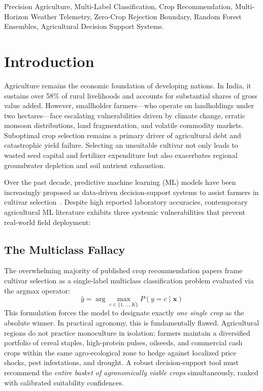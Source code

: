 \documentclass[conference]{IEEEtran}
\begin{document}
\begin{IEEEkeywords}
Precision Agriculture, Multi-Label Classification, Crop Recommendation, Multi-Horizon Weather Telemetry, Zero-Crop Rejection Boundary, Random Forest Ensembles, Agricultural Decision Support Systems.
\end{IEEEkeywords}

\section{Introduction}
Agriculture remains the economic foundation of developing nations. In India, it sustains over 58\% of rural livelihoods and accounts for substantial shares of gross value added. However, smallholder farmers—who operate on landholdings under two hectares—face escalating vulnerabilities driven by climate change, erratic monsoon distributions, land fragmentation, and volatile commodity markets. Suboptimal crop selection remains a primary driver of agricultural debt and catastrophic yield failure. Selecting an unsuitable cultivar not only leads to wasted seed capital and fertilizer expenditure but also exacerbates regional groundwater depletion and soil nutrient exhaustion.

Over the past decade, predictive machine learning (ML) models have been increasingly proposed as data-driven decision-support systems to assist farmers in cultivar selection~\cite{patel2020crop,kumar2021machine}. Despite high reported laboratory accuracies, contemporary agricultural ML literature exhibits three systemic vulnerabilities that prevent real-world field deployment:

\subsection{The Multiclass Fallacy}
The overwhelming majority of published crop recommendation papers frame cultivar selection as a single-label multiclass classification problem evaluated via the argmax operator:
\begin{equation}
\hat{y} = \arg\max_{c \in \{1,\dots,K\}} P(y = c \mid \mathbf{x})
\end{equation}
This formulation forces the model to designate exactly \textit{one single crop} as the absolute winner. In practical agronomy, this is fundamentally flawed. Agricultural regions do not practice monoculture in isolation; farmers maintain a diversified portfolio of cereal staples, high-protein pulses, oilseeds, and commercial cash crops within the same agro-ecological zone to hedge against localized price shocks, pest infestations, and drought. A robust decision-support tool must recommend the \textit{entire basket of agronomically viable crops} simultaneously, ranked with calibrated suitability confidences.
\end{document}
